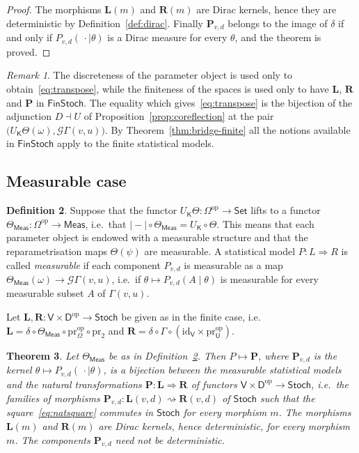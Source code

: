 \documentclass[11pt,a4paper]{article}
\theoremstyle{plain}
\newtheorem{theorem}{Theorem}[section]
\theoremstyle{definition}
\newtheorem{definition}[theorem]{Definition}
\theoremstyle{remark}
\newtheorem{remark}[theorem]{Remark}
\newcommand{\cat}[1]{\mathsf{#1}}
\newcommand{\catU}{\cat{U}}
\newcommand{\catV}{\cat{V}}
\newcommand{\catO}{\cat{\Omega}}
\newcommand{\catD}{\cat{D}}
\newcommand{\catK}{\cat{K}}
\newcommand{\Meas}{\cat{Meas}}
\newcommand{\Set}{\cat{Set}}
\newcommand{\Stoch}{\cat{Stoch}}
\newcommand{\FinStoch}{\cat{FinStoch}}
\newcommand{\G}{\mathcal{G}}
\newcommand{\op}{\mathrm{op}}
\newcommand{\id}{\mathrm{id}}
\newcommand{\pr}{\mathrm{pr}}
\newcommand{\del}{\delta}
\begin{document}
\begin{proof}
The morphisms $\mathbf{L}(m)$ and $\mathbf{R}(m)$ are Dirac kernels, hence
they are deterministic by Definition~\ref{def:dirac}. Finally
$\mathbf{P}_{v,d}$ belongs to the image of $\del$ if and only if
$P_{v,d}(\,\cdot \mid \theta)$ is a Dirac measure for every $\theta$, and the
theorem is proved.
\end{proof}

\begin{remark}\label{rem:bridge-finite}
The discreteness of the parameter object is used only to
obtain~\eqref{eq:transpose}, while the finiteness of the spaces is used only to
have $\mathbf{L}$, $\mathbf{R}$ and $\mathbf{P}$ in $\FinStoch$. The equality
which gives~\eqref{eq:transpose} is the bijection of the adjunction
$D \dashv U$ of Proposition~\ref{prop:coreflection} at the pair
$\bigl(U_\catK\Theta(\omega), \G\Gamma(v,u)\bigr)$. By
Theorem~\ref{thm:bridge-finite} all the notions available in $\FinStoch$ apply
to the finite statistical models.
\end{remark}

\subsection{Measurable case}

\begin{definition}\label{def:measurable-model}
Suppose that the functor $U_\catK\Theta \colon \catO^{\op} \to \Set$ lifts to a
functor $\Theta_\Meas \colon \catO^{\op} \to \Meas$, i.e.\ that
$|\!-\!| \circ \Theta_\Meas = U_\catK \circ \Theta$. This means that each
parameter object is endowed with a measurable structure and that the
reparametrisation maps $\Theta(\psi)$ are measurable. A statistical model
$P \colon L \Rightarrow R$ is called \emph{measurable} if each component
$P_{v,d}$ is measurable as a map $\Theta_\Meas(\omega) \to \G \Gamma(v,u)$,
i.e.\ if $\theta \mapsto P_{v,d}(A \mid \theta)$ is measurable for every
measurable subset $A$ of $\Gamma(v,u)$.
\end{definition}

Let $\mathbf{L}, \mathbf{R} \colon \catV \times \catD^{\op} \to \Stoch$ be
given as in the finite case, i.e.\
$\mathbf{L} = \del \circ \Theta_\Meas \circ \pr_\catO^{\op} \circ \pr_2$ and
$\mathbf{R} = \del \circ \Gamma \circ (\id_\catV \times \pr_\catU^{\op})$.

\begin{theorem}\label{thm:bridge-meas}
Let $\Theta_\Meas$ be as in Definition~\ref{def:measurable-model}. Then
$P \mapsto \mathbf{P}$, where $\mathbf{P}_{v,d}$ is the kernel
$\theta \mapsto P_{v,d}(\,\cdot \mid \theta)$, is a bijection between the
measurable statistical models and the natural transformations
$\mathbf{P} \colon \mathbf{L} \Rightarrow \mathbf{R}$ of functors
$\catV \times \catD^{\op} \to \Stoch$, i.e.\ the families of morphisms
$\mathbf{P}_{v,d} \colon \mathbf{L}(v,d) \rightsquigarrow \mathbf{R}(v,d)$ of
$\Stoch$ such that the square~\eqref{eq:natsquare} commutes in $\Stoch$ for
every morphism $m$. The morphisms $\mathbf{L}(m)$ and $\mathbf{R}(m)$ are
Dirac kernels, hence deterministic, for every morphism $m$. The components
$\mathbf{P}_{v,d}$ need not be deterministic.
\end{theorem}
\end{document}
